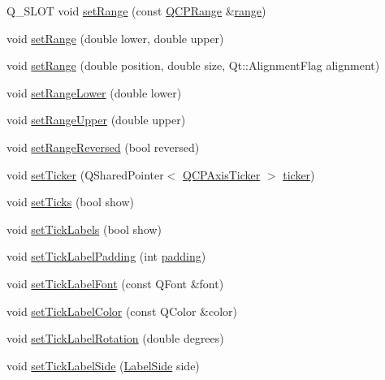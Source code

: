 \begin{DoxyCompactItemize}
\item 
Q\+\_\+\+S\+L\+OT void \mbox{\hyperlink{class_q_c_p_axis_aebdfea5d44c3a0ad2b4700cd4d25b641}{set\+Range}} (const \mbox{\hyperlink{class_q_c_p_range}{Q\+C\+P\+Range}} \&\mbox{\hyperlink{class_q_c_p_axis_ac4058855a81f1a883cf2e754f6a6acb1}{range}})
\item 
void \mbox{\hyperlink{class_q_c_p_axis_a57d6ee9e9009fe88cb19db476ec70bca}{set\+Range}} (double lower, double upper)
\item 
void \mbox{\hyperlink{class_q_c_p_axis_acf60e5b2d631fbc8c4548c3d579cb6d0}{set\+Range}} (double position, double size, Qt\+::\+Alignment\+Flag alignment)
\item 
void \mbox{\hyperlink{class_q_c_p_axis_afcf51227d337db28d1a9ce9a4d1bc91a}{set\+Range\+Lower}} (double lower)
\item 
void \mbox{\hyperlink{class_q_c_p_axis_acd3ca1247aa867b540cd5ec30ccd3bef}{set\+Range\+Upper}} (double upper)
\item 
void \mbox{\hyperlink{class_q_c_p_axis_a2172fdb196b1a0dc3f40992fcad8e9e1}{set\+Range\+Reversed}} (bool reversed)
\item 
void \mbox{\hyperlink{class_q_c_p_axis_a4ee03fcd2c74d05cd1a419b9af5cfbdc}{set\+Ticker}} (Q\+Shared\+Pointer$<$ \mbox{\hyperlink{class_q_c_p_axis_ticker}{Q\+C\+P\+Axis\+Ticker}} $>$ \mbox{\hyperlink{class_q_c_p_axis_a7b7a27151be8235059e1294f73ecf615}{ticker}})
\item 
void \mbox{\hyperlink{class_q_c_p_axis_ac891409315bc379e3b1abdb162c1a011}{set\+Ticks}} (bool show)
\item 
void \mbox{\hyperlink{class_q_c_p_axis_a04ba16e1f6f78d70f938519576ed32c8}{set\+Tick\+Labels}} (bool show)
\item 
void \mbox{\hyperlink{class_q_c_p_axis_af302c479af9dbc2e9f0e44e07c0012ee}{set\+Tick\+Label\+Padding}} (int \mbox{\hyperlink{class_q_c_p_axis_a07df379d5c017b8f3a4702532eb037b2}{padding}})
\item 
void \mbox{\hyperlink{class_q_c_p_axis_a2b8690c4e8dbc39d9185d2b398ce7a6c}{set\+Tick\+Label\+Font}} (const Q\+Font \&font)
\item 
void \mbox{\hyperlink{class_q_c_p_axis_a395e445c3fe496b935bee7b911ecfd1c}{set\+Tick\+Label\+Color}} (const Q\+Color \&color)
\item 
void \mbox{\hyperlink{class_q_c_p_axis_a1bddd4413df8a576b7ad4b067fb33375}{set\+Tick\+Label\+Rotation}} (double degrees)
\item 
void \mbox{\hyperlink{class_q_c_p_axis_a13ec644fc6e22715744c92c6dfa4f0fa}{set\+Tick\+Label\+Side}} (\mbox{\hyperlink{class_q_c_p_axis_a24b13374b9b8f75f47eed2ea78c37db9}{Label\+Side}} side)

\end{DoxyCompactItemize}
